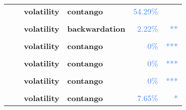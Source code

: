 \documentclass[
  authoryear,
  preprint,
  3p]{elsarticle}
\begin{document}
\begin{longtable}[t]{>{}l>{}l>{}l>{}l>{}r>{}r}
\textbf{} & \textbf{} & \textbf{volatility} & \textbf{contango} & \textcolor[HTML]{4285f4}{54.29\%} & \textcolor[HTML]{4285f4}{}\\
\textbf{\cellcolor{gray!10}{}} & \textbf{\cellcolor{gray!10}{financialisation}} & \textbf{\cellcolor{gray!10}{mean}} & \textbf{\cellcolor{gray!10}{backwardation}} & \textcolor[HTML]{4285f4}{\cellcolor{gray!10}{93.09\%}} & \textcolor[HTML]{4285f4}{\cellcolor{gray!10}{}}\\
\textbf{} & \textbf{} & \textbf{volatility} & \textbf{backwardation} & \textcolor[HTML]{4285f4}{2.22\%} & \textcolor[HTML]{4285f4}{**}\\
\textbf{\cellcolor{gray!10}{}} & \textbf{\cellcolor{gray!10}{crisis}} & \textbf{\cellcolor{gray!10}{mean}} & \textbf{\cellcolor{gray!10}{backwardation}} & \textcolor[HTML]{4285f4}{\cellcolor{gray!10}{58.92\%}} & \textcolor[HTML]{4285f4}{\cellcolor{gray!10}{}}\\
\addlinespace
\textbf{} & \textbf{} & \textbf{volatility} & \textbf{contango} & \textcolor[HTML]{4285f4}{0\%} & \textcolor[HTML]{4285f4}{\vphantom{3} ***}\\
\textbf{\cellcolor{gray!10}{}} & \textbf{\cellcolor{gray!10}{post-crisis}} & \textbf{\cellcolor{gray!10}{mean}} & \textbf{\cellcolor{gray!10}{backwardation}} & \textcolor[HTML]{4285f4}{\cellcolor{gray!10}{11.83\%}} & \textcolor[HTML]{4285f4}{\cellcolor{gray!10}{}}\\
\textbf{} & \textbf{} & \textbf{volatility} & \textbf{contango} & \textcolor[HTML]{4285f4}{0\%} & \textcolor[HTML]{4285f4}{\vphantom{2} ***}\\
\textbf{\cellcolor{gray!10}{GB commodities}} & \textbf{\cellcolor{gray!10}{past}} & \textbf{\cellcolor{gray!10}{mean}} & \textbf{\cellcolor{gray!10}{backwardation}} & \textcolor[HTML]{4285f4}{\cellcolor{gray!10}{78.74\%}} & \textcolor[HTML]{4285f4}{\cellcolor{gray!10}{}}\\
\textbf{} & \textbf{} & \textbf{volatility} & \textbf{contango} & \textcolor[HTML]{4285f4}{0\%} & \textcolor[HTML]{4285f4}{\vphantom{1} ***}\\
\addlinespace
\textbf{\cellcolor{gray!10}{}} & \textbf{\cellcolor{gray!10}{financialisation}} & \textbf{\cellcolor{gray!10}{mean}} & \textbf{\cellcolor{gray!10}{contango}} & \textcolor[HTML]{4285f4}{\cellcolor{gray!10}{27.95\%}} & \textcolor[HTML]{4285f4}{\cellcolor{gray!10}{}}\\
\textbf{} & \textbf{} & \textbf{volatility} & \textbf{contango} & \textcolor[HTML]{4285f4}{7.65\%} & \textcolor[HTML]{4285f4}{*}\\

\end{longtable}
\end{document}
